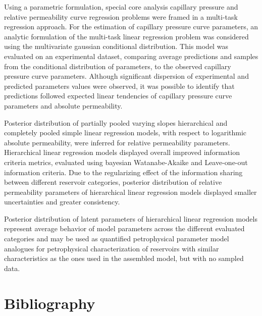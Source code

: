 \documentclass[english,msc,numbers]{coppe}
\begin{document}
  Using a parametric formulation, special core analysis capillary pressure and relative permeability curve regression problems were framed in a multi-task regression approach. For the estimation of capillary pressure curve parameters, an analytic formulation of the multi-task linear regression problem was considered using the multivariate gaussian conditional distribution. This model was evaluated on an experimental dataset, comparing average predictions and samples from the conditional distribution of parameters, to the observed capillary pressure curve parameters. Although significant dispersion of experimental and predicted parameters values were observed, it was possible to identify that predictions followed expected linear tendencies of capillary pressure curve parameters and absolute permeability.
  
  Posterior distribution of partially pooled varying slopes hierarchical and completely pooled simple linear regression models, with respect to logarithmic absolute permeability, were inferred for relative permeability parameters. Hierarchical linear regression models displayed overall improved information criteria metrics, evaluated using bayesian Watanabe-Akaike and Leave-one-out information criteria. Due to the regularizing effect of the information sharing between different reservoir categories, posterior distribution of relative permeability parameters of hierarchical linear regression models displayed smaller uncertainties and greater consistency.
  
  Posterior distribution of latent parameters of hierarchical linear regression models represent average behavior of model parameters across the different evaluated categories and may be used as quantified petrophysical parameter model analogues for petrophysical characterization of reservoirs with similar characteristics as the ones used in the assembled model, but with no sampled data.
  
  \backmatter
  
  
  
  \hypertarget{bibliography}{%
  \chapter*{Bibliography}\label{bibliography}}
  
  
  \setlength{\parindent}{-0.20in}
  \setlength{\leftskip}{0.20in}
  \setlength{\parskip}{8pt}
  
\end{document}
